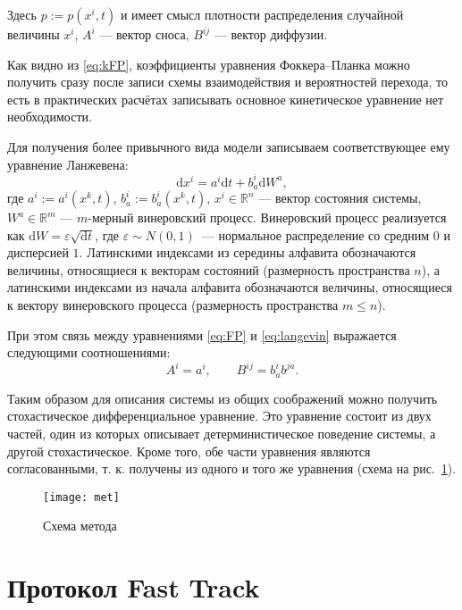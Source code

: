 \documentclass[floatfix,
showkeys,
twocolumn, nofootinbib, superscriptaddress, ]{revtex4-1}
\renewcommand{\d}{\mathrm{d}}
\newcommand{\setR}{\mathbb{R}}
\begin{document}
  Здесь $p := p(x^{i},t)$ и имеет смысл плотности распределения
  случайной величины $x^{i}$, $A^{i}$ --- вектор сноса, $B^{i j}$ ---
  вектор диффузии.

  Как видно из \eqref{eq:kFP}, коэффициенты уравнения Фоккера--Планка
  можно получить сразу после записи схемы взаимодействия и
  вероятностей перехода, то есть в практических расчётах записывать
  основное кинетическое уравнение нет необходимости.

  Для получения более привычного вида модели записываем
  соответствующее ему уравнение Ланжевена:
\begin{equation}
  \label{eq:langevin}
  \d x^{i} = a^{i} \d t + b^i_{a} \d W^{a},
\end{equation}
  где $a^{i} := a^{i} (x^k, t)$, $b^{i}_{a} := b^{i}_{a} (x^k, t)$,
  $x^i \in \setR^n $ --- вектор состояния системы, $W^{a} \in
  \mathbb{R}^m$ --- $m$-мерный винеровский процесс. Винеровский
  процесс реализуется как $\d W = \varepsilon \sqrt{\d t}$, где
  $\varepsilon \sim N(0,1)$~--- нормальное распределение со средним
  $0$ и дисперсией $1$. Латинскими индексами из середины алфавита
  обозначаются величины, относящиеся к векторам состояний (размерность
  пространства $n$), а латинскими индексами из начала алфавита
  обозначаются величины, относящиеся к вектору винеровского процесса
  (размерность пространства $m \leqslant n$).

  При этом связь между уравнениями \eqref{eq:FP} и \eqref{eq:langevin}
  выражается следующими соотношениями:
\begin{equation}
  \label{eq:k-langevin}
  A^{i} = a^{i}, \qquad B^{i j} = b^{i}_{a} b^{j a}.
\end{equation}



  Таким образом для описания системы из общих соображений можно
  получить стохастическое дифференциальное уравнение. Это уравнение
  состоит из двух частей, один из которых описывает детерминистическое
  поведение системы, а другой стохастическое. Кроме того, обе части
  уравнения являются согласованными, т. к. получены из одного и того
  же уравнения (схема на рис.~\ref{fig:met}).

\begin{figure}\centering
  \texttt{[image: met]}
  \caption{Схема метода}
\label{fig:met}
\end{figure}

\section{Протокол Fast Track}
\end{document}
